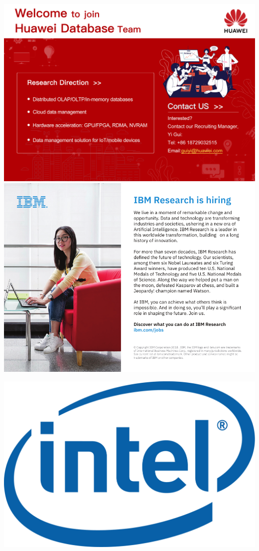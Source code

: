 \includegraphics[height=.49\textheight,width=\textwidth,keepaspectratio]{ads/huawei.jpg}
\vfill
\includegraphics[height=.49\textheight,width=\textwidth,keepaspectratio]{ads/ibm.pdf}
\pagebreak

\includegraphics[height=.35\textheight,width=\textwidth,keepaspectratio]{sponsoricons/intel.png}
\vfill


